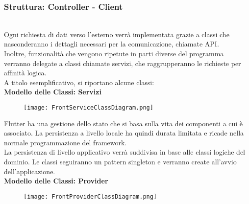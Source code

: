 \subsubsection{Struttura: Controller - Client}\mbox{}\\
Ogni richiesta di dati verso l'esterno verrà implementata grazie a classi che nasconderanno i dettagli necessari per la comunicazione, chiamate API.\\
Inoltre, funzionalità che vengono ripetute in parti diverse del programma verranno delegate a classi chiamate servizi, che raggrupperanno le richieste per affinità logica.\\
A titolo esemplificativo, si riportano alcune classi:\\
\textbf{Modello delle Classi: Servizi}\\
\begin{figure}[h!]
    \begin{center}
        \texttt{[image: FrontServiceClassDiagram.png]}
    \end{center}
\end{figure}

Flutter ha una gestione dello stato che si basa sulla vita dei componenti a cui è associato. La persistenza a livello locale ha quindi durata limitata e ricade nella normale programmazione del framework.\\
La persistenza di livello applicativo verrà suddivisa in base alle classi logiche del dominio. Le classi seguiranno un pattern singleton e verranno create all'avvio dell'applicazione.\\
\textbf{Modello delle Classi: Provider}\\
\begin{figure}[h!]
    \begin{center}
        \texttt{[image: FrontProviderClassDiagram.png]}
    \end{center}
\end{figure}
\clearpage

